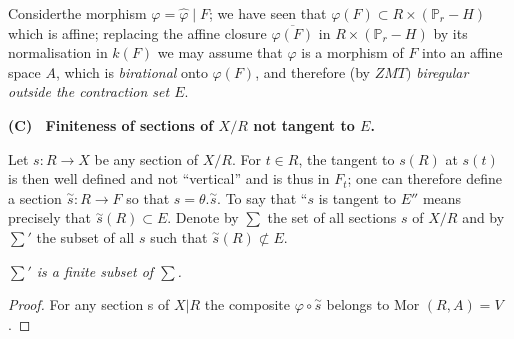 Consider\pageoriginale the morphism $ \varphi = \hat{\varphi} \mid F$; we have
seen that $\varphi (F) \subset R \times (\mathbb{P}_{r} -H)$ which is
affine; replacing the affine closure $ \overline{\varphi(F)}$ in $ R
\times (\mathbb{P}_r -H)$ by its normalisation in $k(F)$ we may assume
that $\varphi$ is a morphism of $F$ into an affine space $A$, which is
\textit{birational} onto $ \varphi(F)$, and therefore (by $ZMT)$
\textit{biregular outside the contraction set $E$}. 

\medskip
\noindent
\textbf{(C)~ Finiteness of sections of $ X / R $ not tangent to $E$. }

Let $s : R \rightarrow X $  be any section of $ X / R$. For $t \in R$,
the tangent to $s(R)$ at $s(t)$ is then well defined and not
``vertical'' and is thus in $F_t$; one can therefore define a section
$\overset{\sim}{s} : R \rightarrow F$ so that $ s = \theta
. \overset{\sim}{s}$. To say that ``$s$ is tangent to $E''$ means
precisely that $\overset{\sim}{s}(R) \subset E$. Denote by $\sum$ the
set of all sections $s$ of $ X / R$ and by $\sum'$ the subset of all $s$ such
that $ \overset{\sim}{s}(R) \not\subset E$. 

\setcounter{proposition}{0}
\begin{proposition}\label{chap3:sec2:prop1} %
  {\em $\sum'$ is a finite subset of $\sum$.}
\end{proposition}

\begin{proof}%
  For any section s of $ X | R$ the composite $\varphi
  \circ\overset{\sim}{s}$ belongs to Mor $(R,A) = V$. 
\end{proof}

